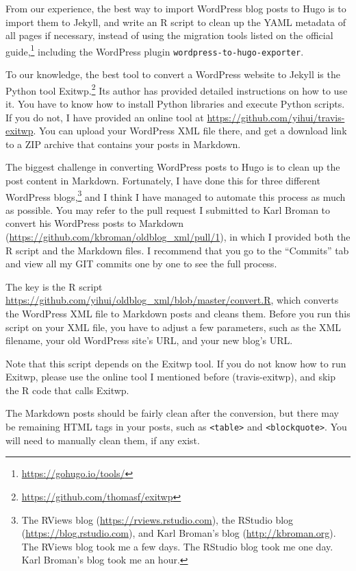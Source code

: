 \documentclass[12pt,]{krantz}
\renewcommand{\href}[2]{#2\footnote{\url{#1}}}
\theoremstyle{definition}
\theoremstyle{definition}
\theoremstyle{definition}
\theoremstyle{remark}
\begin{document}
From our experience, the best way to import WordPress
blog posts to Hugo is to import them to Jekyll, and write an R script to
clean up the YAML metadata of all pages if necessary, instead of using
the migration tools listed on the
\href{https://gohugo.io/tools/}{official guide,} including the WordPress
plugin \texttt{wordpress-to-hugo-exporter}.

To our knowledge, the best tool to convert a WordPress website to Jekyll
is the Python tool \href{https://github.com/thomasf/exitwp}{Exitwp.} Its
author has provided detailed instructions on how to use it. You have to
know how to install Python libraries and execute Python scripts. If you
do not, I have provided an online tool at
\url{https://github.com/yihui/travis-exitwp}. You can upload your
WordPress XML file there, and get a download link to a ZIP archive that
contains your posts in Markdown.

The biggest challenge in converting WordPress posts to Hugo is to clean
up the post content in Markdown. Fortunately, I have done this for three
different WordPress blogs,\footnote{The RViews blog
  (\url{https://rviews.rstudio.com}), the RStudio blog
  (\url{https://blog.rstudio.com}), and Karl Broman's blog
  (\url{http://kbroman.org}). The RViews blog took me a few days. The
  RStudio blog took me one day. Karl Broman's blog took me an hour.} and
I think I have managed to automate this process as much as possible. You
may refer to the pull request I submitted to Karl Broman to convert his
WordPress posts to Markdown
(\url{https://github.com/kbroman/oldblog_xml/pull/1}), in which I
provided both the R script and the Markdown files. I recommend that you
go to the ``Commits'' tab and view all my GIT commits one by one to see
the full process.

The key is the R script
\url{https://github.com/yihui/oldblog_xml/blob/master/convert.R}, which
converts the WordPress XML file to Markdown posts and cleans them.
Before you run this script on your XML file, you have to adjust a few
parameters, such as the XML filename, your old WordPress site's URL, and
your new blog's URL.

Note that this script depends on the Exitwp tool. If you do not know how
to run Exitwp, please use the online tool I mentioned before
(travis-exitwp), and skip the R code that calls Exitwp.

The Markdown posts should be fairly clean after the conversion, but
there may be remaining HTML tags in your posts, such as
\texttt{\textless{}table\textgreater{}} and
\texttt{\textless{}blockquote\textgreater{}}. You will need to manually
clean them, if any exist.
\end{document}
